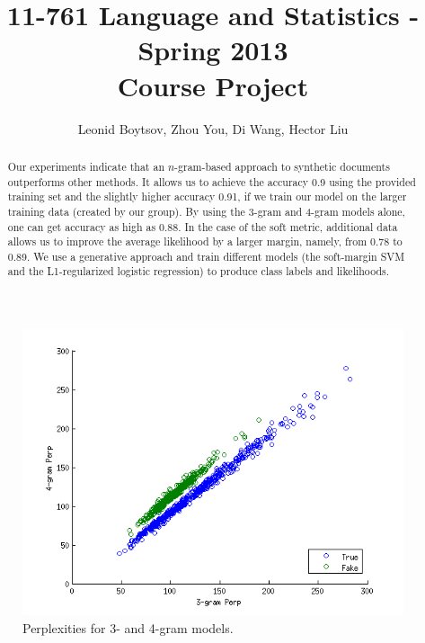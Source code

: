 \documentclass[11pt]{article}
\newcommand{\ngram}{\mbox{$n$-gram}}
\begin{document}
\title{11-761 Language and Statistics - Spring 2013\\
Course Project}
\author{Leonid Boytsov, Zhou You, Di Wang, Hector Liu}
\date{}
\maketitle

\thispagestyle{empty}
\setlength{\parindent}{0pt}

\begin{abstract}
Our experiments indicate that 
an \ngram-based approach to synthetic documents outperforms other methods.
It allows us to achieve the accuracy 0.9 using the provided training set and the
slightly higher accuracy 0.91, if we train our model on the larger training data
(created by our group).
By using the 3-gram and 4-gram models alone, one can get accuracy as high as 0.88.
In the case of the soft metric, additional data allows us to improve the average
likelihood by a larger margin, namely, from 0.78 to 0.89.
We use a generative approach and train different models (the soft-margin SVM and 
the L1-regularized logistic regression)
to produce class labels and likelihoods.
\end{abstract}

\begin{figure}[H]\centering
\includegraphics[scale=0.7]{erroranalysisGram34.png}
\caption{Perplexities for 3- and 4-gram models.\label{Fig1}}
\end{figure}
\end{document}
